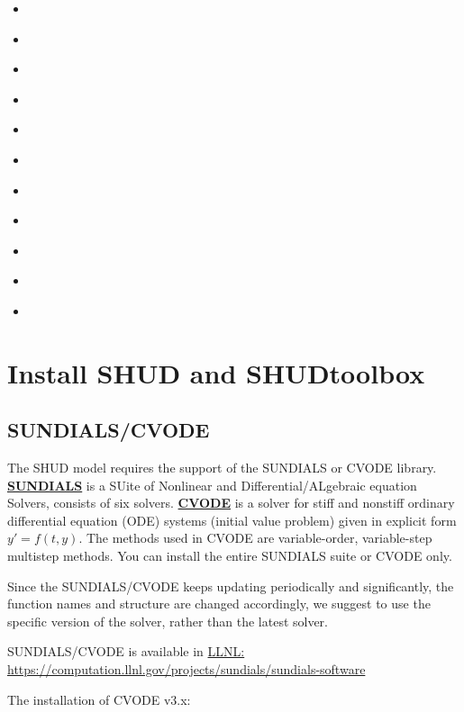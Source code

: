 \documentclass[
]{scrbook}
\providecommand{\tightlist}{%
  \setlength{\itemsep}{0pt}\setlength{\parskip}{0pt}}
\begin{document}
\begin{itemize}
\tightlist
\item
  \citep{Qu2004}
\item
  \citep{Qu2007}
\item
  \citep{Li2008}
\item
  \citep{Kumar2004a}
\item
  \citep{Kumar2009d}
\item
  \citep{Yu2015}
\item
  \citep{Yu2014}
\item
  \citep{Li2011}
\item
  \citep{Shi2015}
\item
  \citep{Shi2015a}
\item
  \citep{Bhatt2014}
\end{itemize}

\hypertarget{install-shud-and-shudtoolbox}{%
\chapter{Install SHUD and SHUDtoolbox}\label{install-shud-and-shudtoolbox}}

\hypertarget{sundialscvode}{%
\section{SUNDIALS/CVODE}\label{sundialscvode}}

The SHUD model requires the support of the SUNDIALS or CVODE library.
\href{https://computation.llnl.gov/projects/sundials}{\textbf{SUNDIALS}} is a SUite of Nonlinear and Differential/ALgebraic equation Solvers, consists of six solvers. \href{https://computation.llnl.gov/projects/sundials/cvode}{\textbf{CVODE}} is a solver for stiff and nonstiff ordinary differential equation (ODE) systems (initial value problem) given in explicit form \(y' = f(t,y)\). The methods used in CVODE are variable-order, variable-step multistep methods. You can install the entire SUNDIALS suite or CVODE only.

Since the SUNDIALS/CVODE keeps updating periodically and significantly, the function names and structure are changed accordingly, we suggest to use the specific version of the solver, rather than the latest solver.

SUNDIALS/CVODE is available in \href{https://computation.llnl.gov/projects/sundials/sundials-software}{LLNL: https://computation.llnl.gov/projects/sundials/sundials-software}

The installation of CVODE v3.x:
\end{document}
